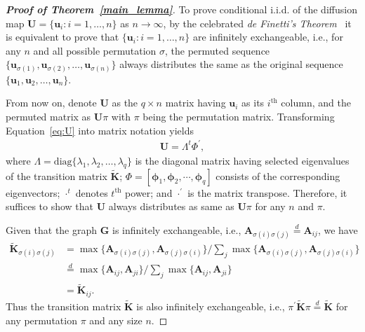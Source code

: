 \documentclass[12pt]{article}
\theoremstyle{definition}
\begin{document}
	\begin{proof}[\textbf{Proof of Theorem~\ref{main_lemma}}]
		To prove conditional i.i.d. of the diffusion map $\mathbf{U} = \{\mathbf{u}_i : i=1,\ldots,n\}$ as $n \rightarrow \infty$, by the celebrated \textit{de Finetti's Theorem}~\citep{diaconis1980finite,orbanz2015bayesian} it is equivalent to prove that $\{ \mathbf{u}_i : i=1,\ldots,n \}$ are infinitely exchangeable, i.e., for any $n$ and all possible permutation $\sigma$, the permuted sequence $\{\mathbf{u}_{\sigma(1)}, \mathbf{u}_{\sigma(2)}, \ldots,\mathbf{u}_{\sigma(n)}\}$ always distributes the same as the original sequence $\{\mathbf{u}_{1}, \mathbf{u}_{2}, \ldots,\mathbf{u}_{n}\}$.
		
		From now on, denote $\mathbf{U}$ as the $q \times n$ matrix having $\mathbf{u}_i$ as its $i^{\mbox{th}}$ column, and the permuted matrix as $\mathbf{U} \pi$ with $\pi$ being the permutation matrix. Transforming Equation~\ref{eq:U} into matrix notation yields
		\begin{align*}
		\mathbf{U}=\Lambda^{t}\Phi^{'},
		\end{align*}
		where $\Lambda=\mbox{diag} \{ \lambda_{1},\lambda_2,\ldots,\lambda_q \}$ is the diagonal matrix having selected eigenvalues of the transition matrix $\mathbf{\widetilde{K}}$; $\Phi =[ \mathbf{\phi}_1, \mathbf{\phi}_2,\cdots, \mathbf{\phi}_q ]$ consists of the corresponding eigenvectors; $\cdot^{t}$ denotes $t^{\mbox{th}}$ power; and $\cdot^{'}$ is the matrix transpose. Therefore, it suffices to show that $\mathbf{U}$ always distributes as same as $\mathbf{U} \pi$ for any $n$ and $\pi$.
		
		Given that the graph $\mathbf{G}$ is infinitely exchangeable, i.e., $\mathbf{A}_{\sigma(i)\sigma(j)} \stackrel{d}{=} \mathbf{A}_{ij}$, we have
		\begin{align*}
		\mathbf{\widetilde{K}}_{\sigma(i) \sigma(j)} &= \max\{\mathbf{A}_{\sigma(i) \sigma(j)},\mathbf{A}_{\sigma(j) \sigma(i)}\} / \sum\limits_{j} \max\{\mathbf{A}_{\sigma(i) \sigma(j)},\mathbf{A}_{\sigma(j) \sigma(i)}\} \\
		&\stackrel{d}{=} \max\{\mathbf{A}_{ij},\mathbf{A}_{ji}\} / \sum\limits_{j} \max\{\mathbf{A}_{ij},\mathbf{A}_{ji}\} \\
		&= \mathbf{\widetilde{K}}_{ij}.
		\end{align*}
		Thus the transition matrix $\mathbf{\widetilde{K}}$ is also infinitely exchangeable, i.e., $\pi^{'} \mathbf{\widetilde{K}} \pi \stackrel{d}{=} \mathbf{\widetilde{K}}$ for any permutation $\pi$ and any size $n$. 
		

\end{proof}
\end{document}
